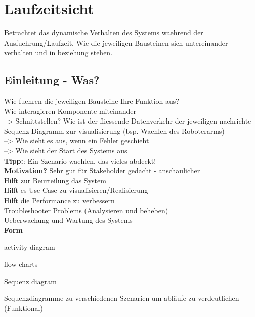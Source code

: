 \chapter{Laufzeitsicht}

Betrachtet das dynamische Verhalten des Systems waehrend der Ausfuehrung/Laufzeit.
Wie die jeweiligen Bausteinen sich untereinander verhalten und in beziehung stehen. 

\section{Einleitung - Was?}

Wie fuehren die jeweiligen Bausteine Ihre Funktion aus?\\
Wie interagieren Komponente miteinander\\
 --> Schnittstellen? 
Wie ist der fliessende Datenverkehr der jeweiligen nachrichte\\
Sequenz Diagramm zur visualisierung (bsp. Waehlen des Roboterarms)\\
 --> Wie sieht es aus, wenn ein Fehler geschieht\\
 --> Wie sieht der Start des Systems aus\\

 \textbf{Tipp:}:
 Ein Szenario waehlen, das vieles abdeckt!\\

 \textbf{Motivation?}
 Sehr gut für Stakeholder gedacht - anschaulicher\\
 Hilft zur Beurteilung das System\\
 Hilft es Use-Case zu visualisieren/Realisierung\\
 Hilft die Performance zu verbessern\\
 Troubleshooter Problems (Analysieren und beheben)\\
 Ueberwachung und Wartung des Systems\\
 


\textbf{Form}

\item activity diagram
\item flow charts
\item Sequenz diagram


Sequenzdiagramme zu verschiedenen Szenarien um abläufe zu verdeutlichen (Funktional)




